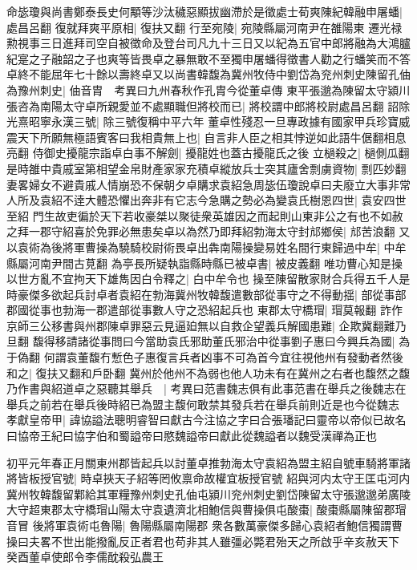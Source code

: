 命毖瓊與尚書鄭泰長史何顒等沙汰穢惡顯拔幽滯於是徵處士荀爽陳紀韓融申屠蟠|{
	處昌呂翻}
復就拜爽平原相|{
	復扶又翻}
行至宛陵|{
	宛陵縣屬河南尹在雒陽東}
遷光禄勲視事三日進拜司空自被徵命及登台司凡九十三日又以紀為五官中郎將融為大鴻臚紀寔之子融韶之子也爽等皆畏卓之暴無敢不至獨申屠蟠得徵書人勸之行蟠笑而不答卓終不能屈年七十餘以壽終卓又以尚書韓馥為冀州牧侍中劉岱為兖州刺史陳留孔伷為豫州刺史|{
	伷音胄　考異曰九州春秋作孔胄今從董卓傳}
東平張邈為陳留太守潁川張咨為南陽太守卓所親愛並不處顯職但將校而已|{
	將校謂中郎將校尉處昌呂翻}
詔除光熹昭寧永漢三號|{
	除三號復稱中平六年}
董卓性殘忍一旦專政據有國家甲兵珍寶威震天下所願無極語賓客曰我相貴無上也|{
	自言非人臣之相其悖逆如此語牛倨翻相息亮翻}
侍御史擾龍宗詣卓白事不解劍|{
	擾龍姓也蓋古擾龍氏之後}
立檛殺之|{
	檛側瓜翻}
是時雒中貴戚室第相望金帛財產家家充積卓縱放兵士突其廬舍剽虜資物|{
	剽匹妙翻}
妻畧婦女不避貴戚人情崩恐不保朝夕卓購求袁紹急周毖伍瓊說卓曰夫廢立大事非常人所及袁紹不逹大體恐懼出奔非有它志今急購之勢必為變袁氏樹恩四世|{
	袁安四世至紹}
門生故吏徧於天下若收豪桀以聚徒衆英雄因之而起則山東非公之有也不如赦之拜一郡守紹喜於免罪必無患矣卓以為然乃即拜紹勃海太守封邟鄉侯|{
	邟苦浪翻}
又以袁術為後將軍曹操為驍騎校尉術畏卓出犇南陽操變易姓名間行東歸過中牟|{
	中牟縣屬河南尹間古莧翻}
為亭長所疑執詣縣時縣已被卓書|{
	被皮義翻}
唯功曹心知是操以世方亂不宜拘天下雄雋因白令釋之|{
	白中牟令也}
操至陳留散家財合兵得五千人是時豪傑多欲起兵討卓者袁紹在勃海冀州牧韓馥遣數部從事守之不得動揺|{
	部從事部郡國從事也勃海一郡遣部從事數人守之恐紹起兵也}
東郡太守橋瑁|{
	瑁莫報翻}
詐作京師三公移書與州郡陳卓罪惡云見逼廹無以自救企望義兵解國患難|{
	企欺冀翻難乃旦翻}
馥得移請諸從事問曰今當助袁氏邪助董氏邪治中從事劉子惠曰今興兵為國|{
	為于偽翻}
何謂袁董馥冇慙色子惠復言兵者凶事不可為首今宜往視他州有發動者然後和之|{
	復扶又翻和戶卧翻}
冀州於他州不為弱也他人功未有在冀州之右者也馥然之馥乃作書與紹道卓之惡聽其舉兵　|{
	考異曰范書魏志俱有此事范書在舉兵之後魏志在舉兵之前若在舉兵後時紹已為盟主馥何敢禁其發兵若在舉兵前則近是也今從魏志}
孝獻皇帝甲|{
	諱協謚法聰明睿智曰獻古今注協之字曰合張璠記曰靈帝以帝似已故名曰協帝王紀曰協字伯和蜀謚帝曰愍魏謚帝曰獻此從魏謚者以魏受漢禪為正也}


初平元年春正月關東州郡皆起兵以討董卓推勃海太守袁紹為盟主紹自號車騎將軍諸將皆板授官號|{
	時卓挾天子紹等罔攸禀命故權宜板授官號}
紹與河内太守王匡屯河内冀州牧韓馥留鄴給其軍糧豫州刺史孔伷屯潁川兖州刺史劉岱陳留太守張邈邈弟廣陵大守超東郡太守橋瑁山陽太守袁遺濟北相鮑信與曹操俱屯酸棗|{
	酸棗縣屬陳留郡瑁音冒}
後將軍袁術屯魯陽|{
	魯陽縣屬南陽郡}
衆各數萬豪傑多歸心袁紹者鮑信獨謂曹操曰夫畧不世出能撥亂反正者君也苟非其人雖彊必斃君殆天之所啟乎辛亥赦天下　癸酉董卓使郎令李儒酖殺弘農王

